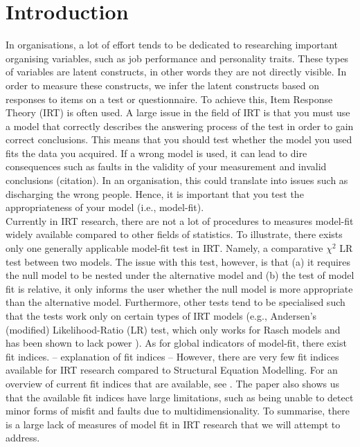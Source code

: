 \documentclass{article}
\begin{document}
\part{Introduction}
In organisations, a lot of effort tends to be dedicated to researching important organising variables, such as job performance and personality traits. These types of variables are latent constructs, in other words they are not directly visible. In order to measure these constructs, we infer the latent constructs based on responses to items on a test or questionnaire. To achieve this, Item Response Theory (IRT) is often used. A large issue in the field of IRT is that you must use a model that correctly describes the answering process of the test in order to gain correct conclusions. This means that you should test whether the model you used fits the data you acquired. If a wrong model is used, it can lead to dire consequences such as faults in the validity of your measurement \autocite{consq1} and invalid conclusions (citation). In an organisation, this could translate into issues such as discharging the wrong people. Hence, it is important that you test the appropriateness of your model (i.e., model-fit). \\
\indent Currently in IRT research, there are not a lot of procedures to measures model-fit widely available  compared to other fields of statistics. To illustrate, there exists only one generally applicable model-fit test in IRT. Namely, a comparative $\chi^2$ LR test between two models. The issue with this test, however, is that (a) it requires the null model to be nested under the alternative model and (b) the test of model fit is relative, it only informs the user whether the null model is more appropriate than the alternative model. Furthermore, other tests tend to be specialised such that the tests work only on certain types of IRT models (e.g., Andersen's (modified) Likelihood-Ratio (LR) test, which only works for Rasch models and has been shown to lack power \autocite{ref2}). As for global indicators of model-fit, there exist fit indices. -- explanation of fit indices -- However, there are very few fit indices available for IRT research compared to Structural Equation Modelling. For an overview of current fit indices that are available, see \textcite{ref1}. The paper also shows us that the available fit indices have large limitations, such as being unable to detect minor forms of misfit and faults due to multidimensionality. To summarise, there is a large lack of measures of model fit in IRT research that we will attempt to address.\\
\end{document}
